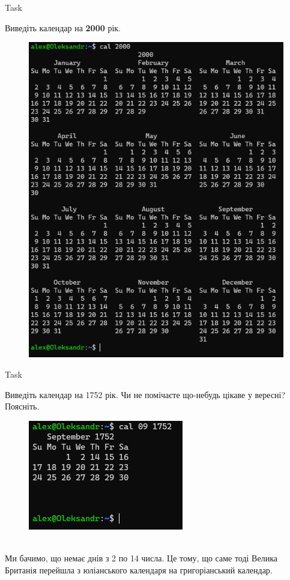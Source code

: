 \documentclass[a4paper,12pt]{article}
\newcommand{\RomanNumeralCaps}[1]{\MakeUppercase{\romannumeral #1}}
\begin{document}
\newpage
    \begin{center}
        \Large{Task \RomanNumeralCaps{6}}
    \end{center}
    Виведіть календар на \textbf{2000} рік.
    \begin{figure}[h!]
        \begin{minipage}[h]{1\linewidth}
            \centering
            \includegraphics[width=0.6\linewidth]{Prt sc/Figure_6.png}  
        \end{minipage}
    \end{figure}
    
    \begin{center}
        \Large{Task \RomanNumeralCaps{7}}
    \end{center}
    Виведіть календар на 1752 рік. Чи не помічаєте що-небудь цікаве у вересні? Поясніть.
    \begin{figure}[h!]
        \begin{minipage}[h]{1\linewidth}
            \centering
            \includegraphics[width=0.4\linewidth]{Prt sc/Figure_7.png}  
        \end{minipage}
    \end{figure} \\
    Ми бачимо, що немає днів з 2 по 14 числа. Це тому, що саме тоді Велика Британія перейшла 
    з юліанського календаря на григоріанський календар.
\end{document}

